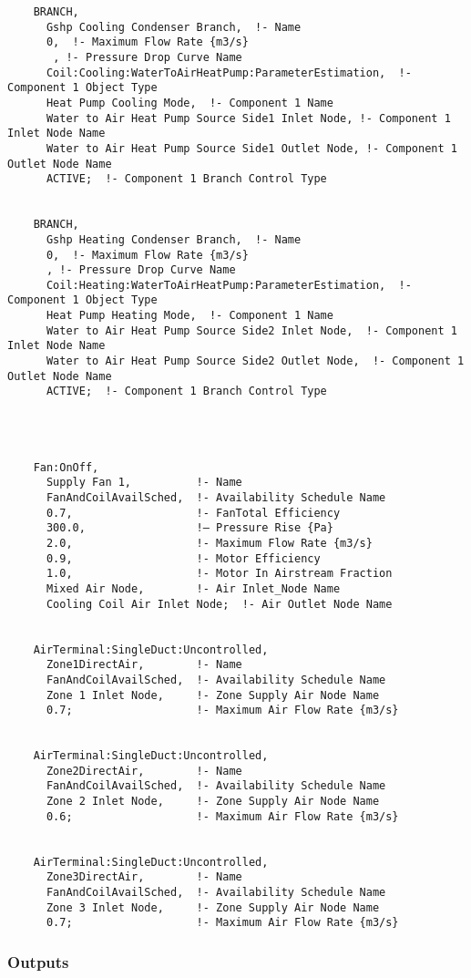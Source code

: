 \begin{lstlisting}
    BRANCH,
      Gshp Cooling Condenser Branch,  !- Name
      0,  !- Maximum Flow Rate {m3/s}
       , !- Pressure Drop Curve Name
      Coil:Cooling:WaterToAirHeatPump:ParameterEstimation,  !- Component 1 Object Type
      Heat Pump Cooling Mode,  !- Component 1 Name
      Water to Air Heat Pump Source Side1 Inlet Node, !- Component 1 Inlet Node Name
      Water to Air Heat Pump Source Side1 Outlet Node, !- Component 1 Outlet Node Name
      ACTIVE;  !- Component 1 Branch Control Type


    BRANCH,
      Gshp Heating Condenser Branch,  !- Name
      0,  !- Maximum Flow Rate {m3/s}
      , !- Pressure Drop Curve Name
      Coil:Heating:WaterToAirHeatPump:ParameterEstimation,  !- Component 1 Object Type
      Heat Pump Heating Mode,  !- Component 1 Name
      Water to Air Heat Pump Source Side2 Inlet Node,  !- Component 1 Inlet Node Name
      Water to Air Heat Pump Source Side2 Outlet Node,  !- Component 1 Outlet Node Name
      ACTIVE;  !- Component 1 Branch Control Type




    Fan:OnOff,
      Supply Fan 1,          !- Name
      FanAndCoilAvailSched,  !- Availability Schedule Name
      0.7,                   !- FanTotal Efficiency
      300.0,                 !– Pressure Rise {Pa}
      2.0,                   !- Maximum Flow Rate {m3/s}
      0.9,                   !- Motor Efficiency
      1.0,                   !- Motor In Airstream Fraction
      Mixed Air Node,        !- Air Inlet_Node Name
      Cooling Coil Air Inlet Node;  !- Air Outlet Node Name


    AirTerminal:SingleDuct:Uncontrolled,
      Zone1DirectAir,        !- Name
      FanAndCoilAvailSched,  !- Availability Schedule Name
      Zone 1 Inlet Node,     !- Zone Supply Air Node Name
      0.7;                   !- Maximum Air Flow Rate {m3/s}


    AirTerminal:SingleDuct:Uncontrolled,
      Zone2DirectAir,        !- Name
      FanAndCoilAvailSched,  !- Availability Schedule Name
      Zone 2 Inlet Node,     !- Zone Supply Air Node Name
      0.6;                   !- Maximum Air Flow Rate {m3/s}


    AirTerminal:SingleDuct:Uncontrolled,
      Zone3DirectAir,        !- Name
      FanAndCoilAvailSched,  !- Availability Schedule Name
      Zone 3 Inlet Node,     !- Zone Supply Air Node Name
      0.7;                   !- Maximum Air Flow Rate {m3/s}
\end{lstlisting}

\subsubsection{Outputs}\label{outputs-6-011}

